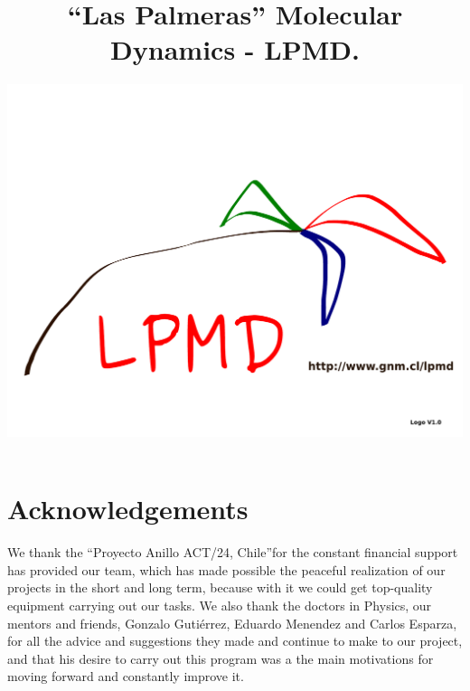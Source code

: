 \documentclass[a4paper,10pt]{scrbook}
\begin{document}
\author{\includegraphics[scale=.35]{logo-lpmd.pdf}}
\title{``Las Palmeras'' Molecular Dynamics - \textbf{LPMD}.}
\maketitle


\chapter*{Acknowledgements}

We thank the ``Proyecto Anillo ACT/24, Chile''for the constant financial
support has provided our team, which has made possible the peaceful realization
of our projects in the short and long term, because with it we could get
top-quality equipment carrying out our tasks. We also thank the doctors in
Physics, our mentors and friends, Gonzalo Gutiérrez, Eduardo Menendez and Carlos
Esparza, for all the advice and suggestions they made and continue to make to
our project, and that his desire to carry out this program was a the main
motivations for moving forward and constantly improve it.
\end{document}
